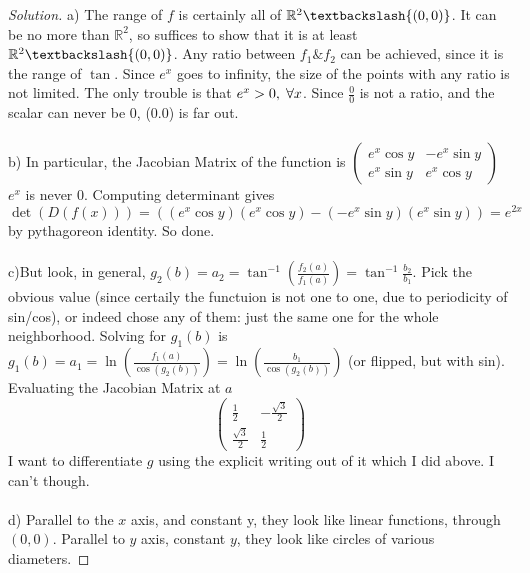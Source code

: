 \documentclass{article}
\newcommand{\R}{\mathbb{R}}
\newenvironment{solution}{\begin{proof}[Solution]}{\end{proof}}
\begin{document}
\begin{solution}
    a) The range of $f$ is certainly all of $\R^{2}\textbackslash{(0,0)}$. It can be no more than $\R^2$, so suffices to show that it is at least $\R^2\textbackslash{(0,0)}$. Any ratio between $f_{1} \& f_{2}$ can be achieved, since it is the range of $\tan$. Since $e^x$ goes to infinity, the size of the points with any ratio is not limited. The only trouble is that $e^{x}>0, \hspace{1mm} \forall x$. Since $\frac{0}{0}$ is not a ratio, and the scalar can never be 0, (0.0) is far out. 
    \\\\
    b) In particular, the Jacobian Matrix of the function is \begin{math}
        \begin{pmatrix}
            e^{x}\cos y & -e^{x}\sin y \\
            e^{x}\sin y & e^{x}\cos y 
        \end{pmatrix}
    \end{math}
    \\
    $e^x$ is never $0$. Computing determinant gives $\det(D(f(x))) = ((e^{x}\cos y)(e^{x}\cos y)-(-e^{x}\sin y)(e^{x}\sin y))= e^{2x}$ by pythagoreon identity.  So done.
    \\\\
    c)But look, in general, $g_{2}(b) = a_{2} = \tan^{-1} (\frac{f_{2}(a)}{f_{1}(a)}) = \tan^{-1}\frac{b_{2}}{b_{1}}$. Pick the obvious value (since certaily the functuion is not one to one, due to periodicity of sin/cos), or indeed chose any of them: just the same one for the whole neighborhood. Solving for $g_{1}(b)$ is $g_{1}(b) = a_{1} = \ln (\frac{f_{1}(a)}{\cos (g_{2}(b))}) = \ln (\frac{b_{1}}{\cos(g_{2}(b))})$ (or flipped, but with sin). 
    \\
    Evaluating the Jacobian Matrix at $a$
    \[
    \begin{pmatrix}
        \frac{1}{2} &-\frac{\sqrt{3}}{2} \\
        \frac{\sqrt{3}}{2} & \frac{1}{2}
    \end{pmatrix}
    \]
    I want to differentiate $g$ using the explicit writing out of it which I did above. I can't though.
    \\ \\
    d) Parallel to the $x$ axis, and constant y, they look like linear functions, through $(0,0)$. Parallel to $y$ axis, constant $y$, they look like circles of various diameters.
    
\end{solution}
\end{document}
